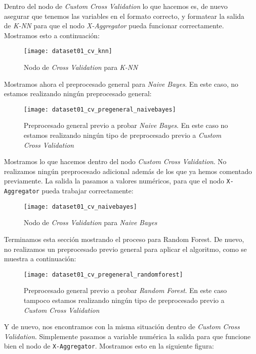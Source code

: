 \documentclass[11pt]{article}
\begin{document}
Dentro del nodo de \emph{Custom Cross Validation} lo que hacemos es, de nuevo asegurar que tenemos las variables en el formato correcto, y formatear la salida de \emph{K-NN} para que el nodo \emph{X-Aggregator} pueda funcionar correctamente. Mostramos esto a continuación:

\begin{figure}[H]
    \centering
    \texttt{[image: dataset01\_cv\_knn]}
    \caption{Nodo de \emph{Cross Validation} para \emph{K-NN}}
\end{figure}

Mostramos ahora el preprocesado general para \emph{Naive Bayes}. En este caso, no estamos realizando ningún preprocesado general:

\begin{figure}[H]
    \centering
    \texttt{[image: dataset01\_cv\_pregeneral\_naivebayes]}
    \caption{Preprocesado general previo a probar \emph{Naive Bayes}. En este caso no estamos realizando ningún tipo de preprocesado previo a \emph{Custom Cross Validation}}
\end{figure}

Mostramos lo que hacemos dentro del nodo \emph{Custom Cross Validation}. No realizamos ningún preprocesado adicional además de los que ya hemos comentado previamente. La salida la pasamos a valores numéricos, para que el nodo \lstinline{X-Aggregator} pueda trabajar correctamente:

\begin{figure}[H]
    \centering
    \texttt{[image: dataset01\_cv\_naivebayes]}
    \caption{Nodo de \emph{Cross Validation} para \emph{Naive Bayes}}
\end{figure}

Terminamos esta sección mostrando el proceso para Random Forest. De nuevo, no realizamos un preprocesado previo general para aplicar el algoritmo, como se muestra a continuación:

\begin{figure}[H]
    \centering
    \texttt{[image: dataset01\_cv\_pregeneral\_randomforest]}
    \caption{Preprocesado general previo a probar \emph{Random Forest}. En este caso tampoco estamos realizando ningún tipo de preprocesado previo a \emph{Custom Cross Validation}}
\end{figure}

Y de nuevo, nos encontramos con la misma situación dentro de \emph{Custom Cross Validation}. Simplemente pasamos a variable numérica la salida para que funcione bien el nodo de \lstinline{X-Aggregator}. Mostramos esto en la siguiente figura:
\end{document}
